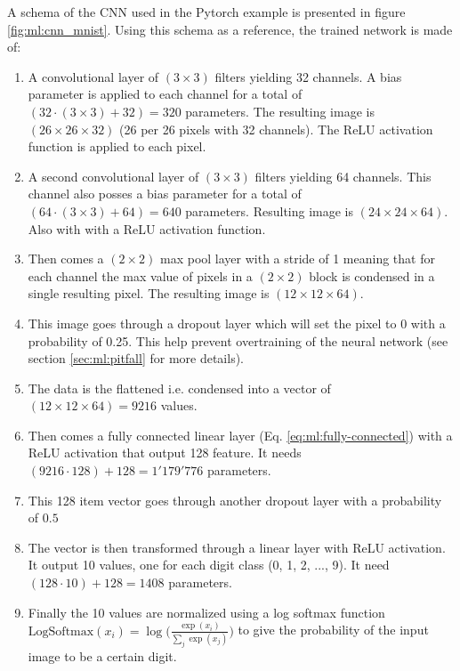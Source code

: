 \documentclass[../main.tex]{subfiles}
\begin{document}
A schema of the CNN used in the Pytorch example is presented in figure \ref{fig:ml:cnn_mnist}. Using this schema as a reference, the trained network is made of:
\begin{enumerate}
  \item A convolutional layer of $(3 \times 3)$ filters yielding 32 channels. A bias parameter is applied to each channel for a total of $(32 \cdot (3\times3) + 32) = 320$ parameters. The resulting image is $(26\times26 \times 32)$ (26 per 26 pixels with 32 channels). The ReLU activation function is applied to each pixel.
  \item A second convolutional layer of $(3 \times 3)$ filters yielding 64 channels. This channel also posses a bias parameter for a total of $(64 \cdot (3\times3) + 64) = 640$ parameters. Resulting image is $(24\times24\times64)$. Also with with a ReLU activation function.
  \item Then comes a $(2\times2)$ max pool layer with a stride of 1 meaning that for each channel the max value of pixels in a $(2\times2)$ block is condensed in a single resulting pixel. The resulting image is $(12 \times 12 \times 64)$.
  \item This image goes through a dropout layer which will set the pixel to 0 with a probability of 0.25. This help prevent overtraining of the neural network (see section \ref{sec:ml:pitfall} for more details).
  \item The data is the flattened i.e. condensed into a vector of $(12 \times 12 \times 64) = 9216$ values.
  \item Then comes a fully connected linear layer (Eq. \ref{eq:ml:fully-connected}) with a ReLU activation that output 128 feature. It needs $(9216 \cdot 128)+ 128 = 1'179'776$ parameters.
  \item This 128 item vector goes through another dropout layer with a probability of $0.5$
  \item The vector is then transformed through a linear layer with ReLU activation. It output 10 values, one for each digit class (0, 1, 2, ..., 9). It need $(128 \cdot 10) + 128 = 1408$ parameters.
  \item Finally the 10 values are normalized using a log softmax function $\mathrm{LogSoftmax}(x_i) = \log \bigg(\frac{\exp(x_i)}{\sum_j \exp(x_j)}\bigg)$ to give the probability of the input image to be a certain digit.
\end{enumerate}
\end{document}
